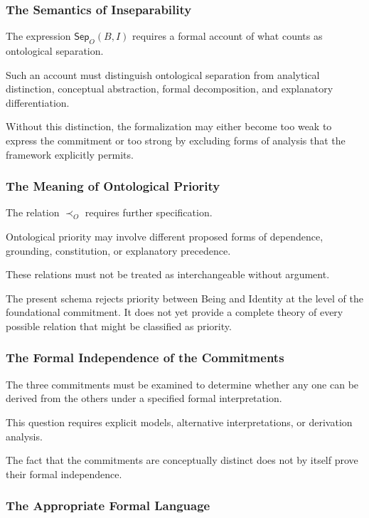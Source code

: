 \subsubsection{The Semantics of Inseparability}

The expression \(\mathsf{Sep}_O(B,I)\)
requires a formal account of what
counts as ontological separation.

Such an account must distinguish
ontological separation from analytical
distinction, conceptual abstraction,
formal decomposition, and explanatory
differentiation.

Without this distinction, the
formalization may either become
too weak to express the commitment
or too strong by excluding forms
of analysis that the framework
explicitly permits.

\subsubsection{The Meaning of Ontological Priority}

The relation \(\prec_O\) requires
further specification.

Ontological priority may involve
different proposed forms of
dependence, grounding, constitution,
or explanatory precedence.

These relations must not be treated
as interchangeable without argument.

The present schema rejects priority
between Being and Identity at the
level of the foundational commitment.
It does not yet provide a complete
theory of every possible relation
that might be classified as priority.

\subsubsection{The Formal Independence of the Commitments}

The three commitments must be
examined to determine whether
any one can be derived from the
others under a specified formal
interpretation.

This question requires explicit
models, alternative interpretations,
or derivation analysis.

The fact that the commitments
are conceptually distinct does
not by itself prove their formal
independence.

\subsubsection{The Appropriate Formal Language}

